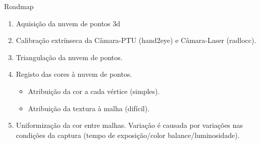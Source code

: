 \begin{frame}{Roadmap}
	    
	\begin{enumerate}
		        
		\item Aquisição da nuvem de pontos 3d
		      
		\item Calibração extrínseca da Câmara-PTU (hand2eye) e Câmara-Laser (radlocc).
		      
		\item Triangulação da nuvem de pontos.
		              
		\item Registo das cores à nuvem de pontos.
		      \begin{itemize}
		      	\item Atribuição da cor a cada vértice (simples).
		      	\item Atribuição da textura à malha (difícil).
		      \end{itemize}
              
        \item Uniformização da cor entre malhas. Variação é causada por variações nas condições da captura (tempo de exposição/color balance/luminosidade).

	\end{enumerate}
	
\end{frame}